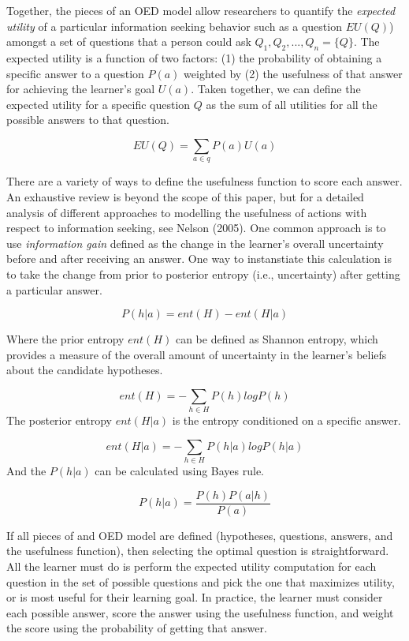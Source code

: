 \documentclass[english,man]{apa6}
\theoremstyle{definition}
\theoremstyle{definition}
\theoremstyle{definition}
\theoremstyle{remark}
\begin{document}
Together, the pieces of an OED model allow researchers to quantify the
\emph{expected utility} of a particular information seeking behavior
such as a question \(EU(Q)\)) amongst a set of questions that a person
could ask \(Q_1, Q_2,..., Q_n = \{Q\}\). The expected utility is a
function of two factors: (1) the probability of obtaining a specific
answer to a question \(P(a)\) weighted by (2) the usefulness of that
answer for achieving the learner's goal \(U(a)\). Taken together, we can
define the expected utility for a specific question \(Q\) as the sum of
all utilities for all the possible answers to that question.

\[EU(Q) = \sum_{a\in q}{P(a)U(a)}\]

There are a variety of ways to define the usefulness function to score
each answer. An exhaustive review is beyond the scope of this paper, but
for a detailed analysis of different approaches to modelling the
usefulness of actions with respect to information seeking, see Nelson
(2005). One common approach is to use \emph{information gain} defined as
the change in the learner's overall uncertainty before and after
receiving an answer. One way to instanstiate this calculation is to take
the change from prior to posterior entropy (i.e., uncertainty) after
getting a particular answer.

\[P(h|a) = ent(H) - ent(H|a)\]

Where the prior entropy \(ent(H)\) can be defined as Shannon entropy,
which provides a measure of the overall amount of uncertainty in the
learner's beliefs about the candidate hypotheses.

\[ent(H) = -\sum_{h\in H}{P(h)logP(h)}\] The posterior entropy
\(ent(H|a)\) is the entropy conditioned on a specific answer.

\[ ent(H|a) = -\sum_{h\in H}{P(h|a)logP(h|a)} \] And the \(P(h|a)\) can
be calculated using Bayes rule.

\[ P(h|a) = \frac{P(h)P(a|h)}{P(a)}  \]

If all pieces of and OED model are defined (hypotheses, questions,
answers, and the usefulness function), then selecting the optimal
question is straightforward. All the learner must do is perform the
expected utility computation for each question in the set of possible
questions and pick the one that maximizes utility, or is most useful for
their learning goal. In practice, the learner must consider each
possible answer, score the answer using the usefulness function, and
weight the score using the probability of getting that answer.
\end{document}
